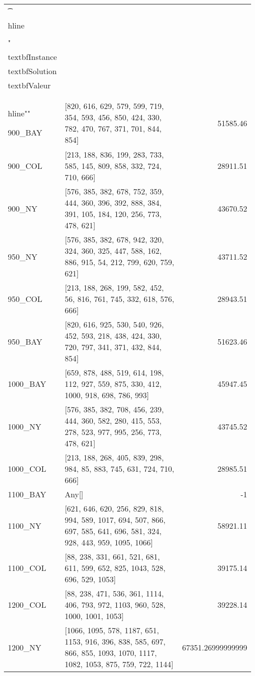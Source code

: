 \documentclass[main.tex]{subfiles}
\begin{document}
\begin{center}
\renewcommand{\arraystretch}{1.4} 
\begin{tabular}{llr}\n\t\\hline\n\\\\\n
"\\textbf{Instance} & \\textbf{Solution} & \\textbf{Valeur} \\\\\\hline\n""

900\_BAY & [820, 616, 629, 579, 599, 719, 354, 593, 456, 850, 424, 330, 782, 470, 767, 371, 701, 844, 854] & 51585.46\\
900\_COL & [213, 188, 836, 199, 283, 733, 585, 145, 809, 858, 332, 724, 710, 666] & 28911.51\\
900\_NY & [576, 385, 382, 678, 752, 359, 444, 360, 396, 392, 888, 384, 391, 105, 184, 120, 256, 773, 478, 621] & 43670.52\\
950\_NY & [576, 385, 382, 678, 942, 320, 324, 360, 325, 447, 588, 162, 886, 915, 54, 212, 799, 620, 759, 621] & 43711.52\\
950\_COL & [213, 188, 268, 199, 582, 452, 56, 816, 761, 745, 332, 618, 576, 666] & 28943.51\\
950\_BAY & [820, 616, 925, 530, 540, 926, 452, 593, 218, 438, 424, 330, 720, 797, 341, 371, 432, 844, 854] & 51623.46\\
1000\_BAY & [659, 878, 488, 519, 614, 198, 112, 927, 559, 875, 330, 412, 1000, 918, 698, 786, 993] & 45947.45\\
1000\_NY & [576, 385, 382, 708, 456, 239, 444, 360, 582, 280, 415, 553, 278, 523, 977, 995, 256, 773, 478, 621] & 43745.52\\
1000\_COL & [213, 188, 268, 405, 839, 298, 984, 85, 883, 745, 631, 724, 710, 666] & 28985.51\\
1100\_BAY & Any[] & -1\\
1100\_NY & [621, 646, 620, 256, 829, 818, 994, 589, 1017, 694, 507, 866, 697, 585, 641, 696, 581, 324, 928, 443, 959, 1095, 1066] & 58921.11\\
1100\_COL & [88, 238, 331, 661, 521, 681, 611, 599, 652, 825, 1043, 528, 696, 529, 1053] & 39175.14\\
1200\_COL & [88, 238, 471, 536, 361, 1114, 406, 793, 972, 1103, 960, 528, 1000, 1001, 1053] & 39228.14\\
1200\_NY & [1066, 1095, 578, 1187, 651, 1153, 916, 396, 838, 585, 697, 866, 855, 1093, 1070, 1117, 1082, 1053, 875, 759, 722, 1144] & 67351.26999999999\\

\end{tabular}
\end{center}
\end{document}
